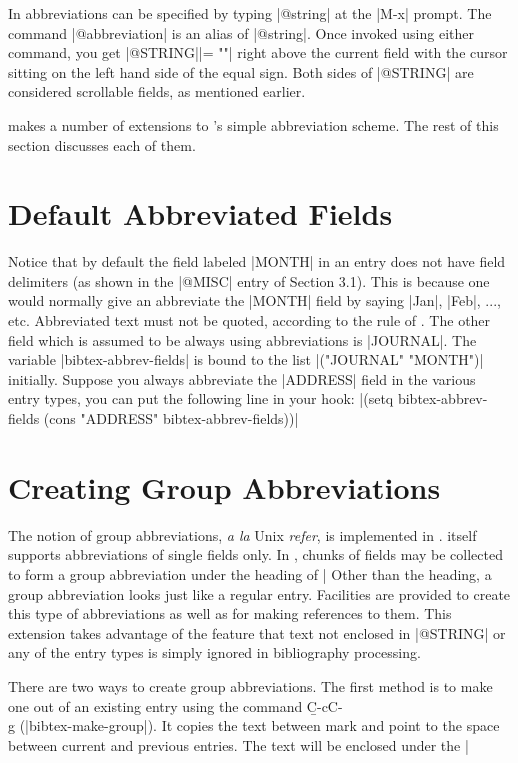 In {\BM} abbreviations can be specified by typing |@string| at
the |M-x| prompt.  The command |@abbreviation| is an alias of |@string|.
Once invoked using either command, you get
\begindisplay
|@STRING{|\block|= ""}|\cr
\enddisplay
right above the current field with the cursor sitting on the left hand
side of the equal sign.  Both sides of |@STRING| are considered
scrollable fields, as mentioned earlier.

{\BM} makes a number of extensions to {\BibTeX}'s simple abbreviation
scheme.  The rest of this section discusses each of them.


\section{Default Abbreviated Fields}

\noindent
Notice that by default the field labeled |MONTH| in an entry 
does not have field delimiters (as shown in the |@MISC| entry of Section 3.1).
This is because one would normally give an abbreviate
the |MONTH| field by saying |Jan|, |Feb|, ..., etc.  
Abbreviated text must not be quoted, according to the
rule of {\BibTeX}.  The other field which is assumed to be always using
abbreviations is |JOURNAL|.  The variable |bibtex-abbrev-fields| is bound
to the list |("JOURNAL" "MONTH")| initially.  Suppose you always
abbreviate the |ADDRESS| field in the various entry types, you can put
the following line in your hook:
\begindisplay
|(setq bibtex-abbrev-fields (cons "ADDRESS" bibtex-abbrev-fields))|\cr
\enddisplay


\section{Creating Group Abbreviations}

\noindent
The notion of group abbreviations, {\it a la\/} Unix {\it refer\/},
is implemented in {\BM}.  {\BibTeX} itself supports abbreviations of
single fields only.  In {\BM}, chunks of fields may be
collected to form a group abbreviation under the heading of |%
Other than the heading, a group abbreviation looks just like a
regular {\BibTeX} entry.  Facilities are provided to create this type
of abbreviations as well as for making references to them.  
This extension takes advantage of the
{\BibTeX} feature that text not enclosed in |@STRING| or any of the entry
types is simply ignored in bibliography processing.

There are two ways to create group abbreviations.
The first method is to make one out of an existing entry using
the command {\b C-c{\s}C-\\{\s}g} (|bibtex-make-group|).
It copies the text between mark and point to the space between
current and previous entries.  The text will be enclosed under
the |%

